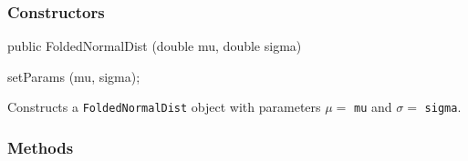 \subsubsection* {Constructors}

\begin{code}

   public FoldedNormalDist (double mu, double sigma)\begin{hide} {
      setParams (mu, sigma);
   }\end{hide}
\end{code}
  \begin{tabb}  Constructs a \texttt{FoldedNormalDist} object with parameters
   $\mu =$  \texttt{mu} and $\sigma =$ \texttt{sigma}.
  \end{tabb}

\subsubsection* {Methods}

